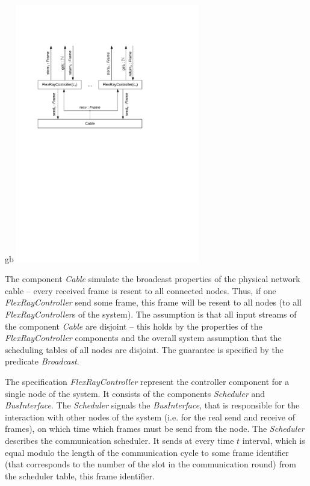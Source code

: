 {\footnotesize
\begin{spec}{\fconsts}{gb}
\centering
\includegraphics[width=8cm]{fig/flexray.pdf}
\end{spec}
}

\noindent
The component \emph{Cable} simulate the broadcast properties of the 
physical network cable -- 
every received \fr frame is resent to all connected nodes. 
Thus, if one \emph{FlexRayController} send some frame, 
this frame will be resent to all nodes 
(to all \emph{FlexRayController}s of the system).
The assumption is that all input streams of the component \emph{Cable} 
 are disjoint -- this holds by the properties of the 
\emph{FlexRayController} components and the overall system assumption that 
the scheduling tables of all nodes are disjoint.  
The guarantee is specified by the predicate \emph{Broadcast}. 

The \Focus specification \emph{FlexRayController} represent the controller component 
for a single node of the system. It consists of the components \emph{Scheduler} 
and \emph{BusInterface}. 
The \emph{Scheduler} signals the \emph{BusInterface}, that is responsible for 
the interaction with other nodes of the system (i.e. for the real send and receive of frames),  
on which time which \fr frames must be send from the node. 
The \emph{Scheduler} describes the communication scheduler. 
It sends at every time $t$ interval, which is equal modulo the length 
of the communication cycle to some \fr frame identifier (that corresponds to the number of the slot in the communication round) from the scheduler table, 
this frame identifier.  

